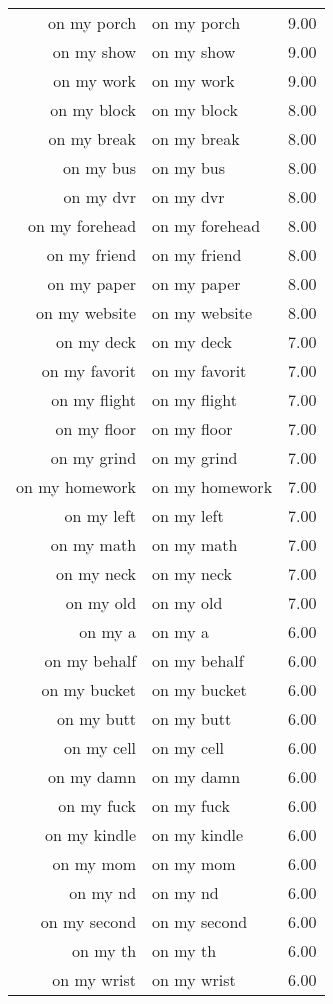 \begin{table}[ht]
\begin{tabular}{rlr}
  on my porch & on my porch & 9.00 \\ 
  on my show & on my show & 9.00 \\ 
  on my work & on my work & 9.00 \\ 
  on my block & on my block & 8.00 \\ 
  on my break & on my break & 8.00 \\ 
  on my bus & on my bus & 8.00 \\ 
  on my dvr & on my dvr & 8.00 \\ 
  on my forehead & on my forehead & 8.00 \\ 
  on my friend & on my friend & 8.00 \\ 
  on my paper & on my paper & 8.00 \\ 
  on my website & on my website & 8.00 \\ 
  on my deck & on my deck & 7.00 \\ 
  on my favorit & on my favorit & 7.00 \\ 
  on my flight & on my flight & 7.00 \\ 
  on my floor & on my floor & 7.00 \\ 
  on my grind & on my grind & 7.00 \\ 
  on my homework & on my homework & 7.00 \\ 
  on my left & on my left & 7.00 \\ 
  on my math & on my math & 7.00 \\ 
  on my neck & on my neck & 7.00 \\ 
  on my old & on my old & 7.00 \\ 
  on my a & on my a & 6.00 \\ 
  on my behalf & on my behalf & 6.00 \\ 
  on my bucket & on my bucket & 6.00 \\ 
  on my butt & on my butt & 6.00 \\ 
  on my cell & on my cell & 6.00 \\ 
  on my damn & on my damn & 6.00 \\ 
  on my fuck & on my fuck & 6.00 \\ 
  on my kindle & on my kindle & 6.00 \\ 
  on my mom & on my mom & 6.00 \\ 
  on my nd & on my nd & 6.00 \\ 
  on my second & on my second & 6.00 \\ 
  on my th & on my th & 6.00 \\ 
  on my wrist & on my wrist & 6.00 \\ 

\end{tabular}
\end{table}

